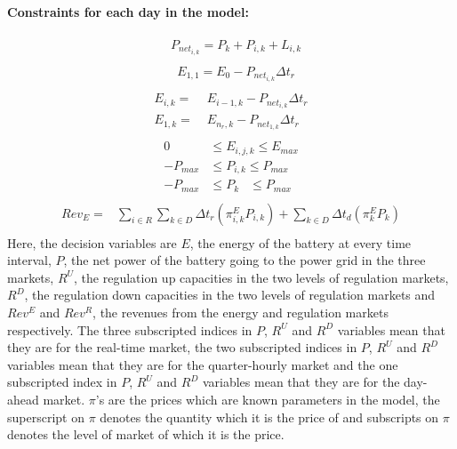 \documentclass[11pt,twoside]{article}
\begin{document}
\paragraph{Constraints for each day in the model:}
\begin{subequations}
\begin{align}
&P_{{net}_{i,k}} = P_{k} + P_{i,k} + L_{i,k}\\
\end{align}
\label{eq:Pnet}
\end{subequations}
\begin{subequations}
\begin{align}
&E_{1,1} = E_{0} - P_{{net}_{i,k}}\Delta t_r\\
\end{align}
\label{eq:eq1}
\end{subequations}
\vspace{-0.45in}
\begin{subequations}
\begin{align}
E_{i,k} =&\; E_{i-1,k}- P_{{net}_{i,k}}\Delta t_r\\
E_{1,k} =&\; E_{n_r,k}- P_{{net}_{1,k}} \Delta t_r\\
\end{align}
\label{eq:eq2}
\end{subequations}
\vspace{-0.45in}
\begin{subequations}
\begin{align}
0 & \leq E_{i,j,k} \leq E_{max}\\
-P_{max} & \leq P_{i,k} \leq P_{max}\\
-P_{max} & \leq P_{k}\phantom{i,} \leq P_{max}\\
\end{align}
\label{eq:eq4}
\end{subequations}\vspace{-0.45in}
\begin{subequations}
\begin{align}
Rev_E =& \sum_{i \in R} \sum_{k \in D} \Delta t_r(\pi^E_{i,k}P_{i,k}) + \sum_{k \in D}\Delta t_d(\pi^E_{k}P_{k})\\
\end{align}
\label{eq5}
\end{subequations}
Here, the decision variables are $E$, the energy of the battery at every time interval, $P$, the net power of the battery going to the power grid in the three markets, $R^U$, the regulation up capacities in the two levels of regulation markets, $R^D$, the regulation down capacities in the two levels of regulation markets and $Rev^E$ and $Rev^R$, the revenues from the energy and regulation markets respectively. The three subscripted indices in $P$, $R^U$ and $R^D$ variables mean that they are for the real-time market, the two subscripted indices in $P$, $R^U$ and $R^D$ variables mean that they are for the quarter-hourly market and the one subscripted index in $P$, $R^U$ and $R^D$ variables mean that they are for the day-ahead market. $\pi$'s are the prices which are known parameters in the model, the superscript on $\pi$ denotes the quantity which it is the price of and subscripts on $\pi$ denotes the level of market of which it is the price.
\end{document}
